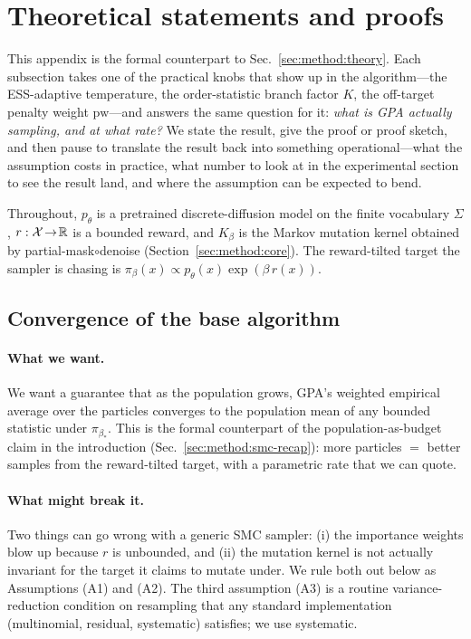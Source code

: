 
\section{Theoretical statements and proofs}\label{app:theory}

This appendix is the formal counterpart to Sec.~\ref{sec:method:theory}. Each subsection takes one of the practical knobs that show up in the algorithm—the ESS-adaptive temperature, the order-statistic branch factor $K$, the off-target penalty weight $\mathrm{pw}$—and answers the same question for it: \emph{what is GPA actually sampling, and at what rate?} We state the result, give the proof or proof sketch, and then pause to translate the result back into something operational—what the assumption costs in practice, what number to look at in the experimental section to see the result land, and where the assumption can be expected to bend.

Throughout, $p_\theta$ is a pretrained discrete-diffusion model on the finite vocabulary $\Sigma$, $r:\mathcal{X}\!\to\!\mathbb{R}$ is a bounded reward, and $K_\beta$ is the Markov mutation kernel obtained by partial-mask$\circ$denoise (Section~\ref{sec:method:core}). The reward-tilted target the sampler is chasing is $\pi_\beta(x)\propto p_\theta(x)\exp(\beta\,r(x))$.

\subsection{Convergence of the base \gpa{} algorithm}\label{app:smc}

\paragraph{What we want.}
We want a guarantee that as the population grows, GPA's weighted empirical average over the particles converges to the population mean of any bounded statistic under $\pi_{\beta_*}$. This is the formal counterpart of the population-as-budget claim in the introduction (Sec.~\ref{sec:method:smc-recap}): more particles $=$ better samples from the reward-tilted target, with a parametric rate that we can quote.

\paragraph{What might break it.}
Two things can go wrong with a generic SMC sampler: (i) the importance weights blow up because $r$ is unbounded, and (ii) the mutation kernel is not actually invariant for the target it claims to mutate under. We rule both out below as Assumptions (A1) and (A2). The third assumption (A3) is a routine variance-reduction condition on resampling that any standard implementation (multinomial, residual, systematic) satisfies; we use systematic.

